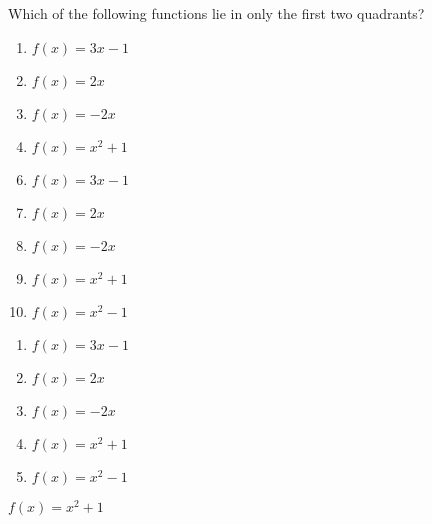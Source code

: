 
 Which of the following functions lie in only the first two quadrants?


\ifsat
	\begin{enumerate}[label=\Alph*)]
		\item  $f(x)=3x-1$
		\item  $f(x)=2x$%
		\item  $f(x)=-2x$
		\item  $f(x)=x^2+1$%
	\end{enumerate}
\else
\fi

\ifacteven
	\begin{enumerate}[label=\textbf{\Alph*.},itemsep=\fill,align=left]
		\setcounter{enumii}{5}
		\item  $f(x)=3x-1$
		\item  $f(x)=2x$%
		\item  $f(x)=-2x$
		\addtocounter{enumii}{1}
		\item  $f(x)=x^2+1$%
		\item  $f(x)=x^2-1$
	\end{enumerate}
\else
\fi

\ifactodd
	\begin{enumerate}[label=\textbf{\Alph*.},itemsep=\fill,align=left]
		\item  $f(x)=3x-1$
		\item  $f(x)=2x$%
		\item  $f(x)=-2x$
		\item  $f(x)=x^2+1$%
		\item  $f(x)=x^2-1$
	\end{enumerate}
\else
\fi

\ifgridin
  $f(x)=x^2+1$%

\else
\fi


